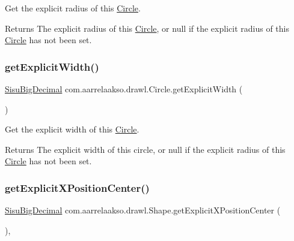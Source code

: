 Get the explicit radius of this \hyperlink{classcom_1_1aarrelaakso_1_1drawl_1_1_circle}{Circle}.

\begin{DoxyReturn}{Returns}
The explicit radius of this \hyperlink{classcom_1_1aarrelaakso_1_1drawl_1_1_circle}{Circle}, or {\ttfamily null} if the explicit radius of this \hyperlink{classcom_1_1aarrelaakso_1_1drawl_1_1_circle}{Circle} has not been set. 
\end{DoxyReturn}
\mbox{\label{classcom_1_1aarrelaakso_1_1drawl_1_1_circle_ab12f4d0269b029217c11ba98755f4348}} 
\subsubsection{\texorpdfstring{get\+Explicit\+Width()}{getExplicitWidth()}}
{\footnotesize\ttfamily \hyperlink{classcom_1_1aarrelaakso_1_1drawl_1_1_sisu_big_decimal}{Sisu\+Big\+Decimal} com.\+aarrelaakso.\+drawl.\+Circle.\+get\+Explicit\+Width (\begin{DoxyParamCaption}{ }\end{DoxyParamCaption})\hspace{0.3cm}{\ttfamily [protected]}}

Get the explicit width of this \hyperlink{classcom_1_1aarrelaakso_1_1drawl_1_1_circle}{Circle}.

\begin{DoxyReturn}{Returns}
The explicit width of this circle, or {\ttfamily null} if the explicit radius of this \hyperlink{classcom_1_1aarrelaakso_1_1drawl_1_1_circle}{Circle} has not been set. 
\end{DoxyReturn}
\mbox{\label{classcom_1_1aarrelaakso_1_1drawl_1_1_shape_a079e4ec300c2ab3cd2514230b7428ea4}} 
\subsubsection{\texorpdfstring{get\+Explicit\+X\+Position\+Center()}{getExplicitXPositionCenter()}}
{\footnotesize\ttfamily \hyperlink{classcom_1_1aarrelaakso_1_1drawl_1_1_sisu_big_decimal}{Sisu\+Big\+Decimal} com.\+aarrelaakso.\+drawl.\+Shape.\+get\+Explicit\+X\+Position\+Center (\begin{DoxyParamCaption}{ }\end{DoxyParamCaption})\hspace{0.3cm}{\ttfamily [protected]}, {\ttfamily [inherited]}}

